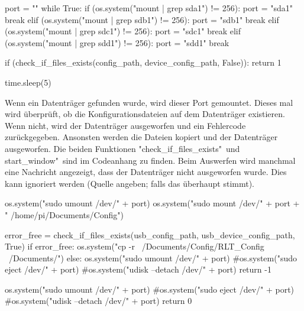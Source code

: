 \begin{pythoncode}
	port = ""
	while True:
		if (os.system("mount | grep sda1") != 256):
			port = "sda1"
			break
		elif (os.system("mount | grep sdb1") != 256):
			port = "sdb1"
			break
		elif (os.system("mount | grep sdc1") != 256):
			port = "sdc1"
			break
		elif (os.system("mount | grep sdd1") != 256):
			port = "sdd1"
			break
		
		if (check_if_files_exists(config_path, device_config_path, False)):
			return 1
			
		time.sleep(5)
\end{pythoncode}

Wenn ein Datenträger gefunden wurde, wird dieser Port gemountet. Dieses mal wird überprüft, ob die Konfigurationsdateien auf dem Datenträger existieren. Wenn nicht, wird der Datenträger ausgeworfen und ein Fehlercode zurückgegeben. Ansonsten werden die Dateien kopiert und der Datenträger ausgeworfen. Die beiden Funktionen "check\_if\_files\_exists"\ und \dq start\_window"\ sind im Codeanhang zu finden. Beim Auswerfen wird manchmal eine Nachricht angezeigt, dass der Datenträger nicht ausgeworfen wurde. Dies kann ignoriert werden (Quelle angeben; falls das überhaupt stimmt).

\begin{pythoncode}
	os.system("sudo umount /dev/" + port)
	os.system("sudo mount /dev/" + port + " /home/pi/Documents/Config")
	
	error_free = check_if_files_exists(usb_config_path, usb_device_config_path, True)
	if error_free:
		os.system("cp -r ~/Documents/Config/RLT_Config ~/Documents/")
	else:
		os.system("sudo umount /dev/" + port)
		#os.system("sudo eject /dev/" + port) 
		#os.system("udisk --detach /dev/" + port)
		return -1
		
	os.system("sudo umount /dev/" + port)
	#os.system("sudo eject /dev/" + port) 
	#os.system("udisk --detach /dev/" + port)
	return 0
\end{pythoncode}